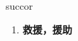 
\begin{frame}
{\huge succor}
\begin{center}
\begin{enumerate}\Large
  \item \textbf{救援，援助}
\end{enumerate}
\end{center}
\end{frame}
